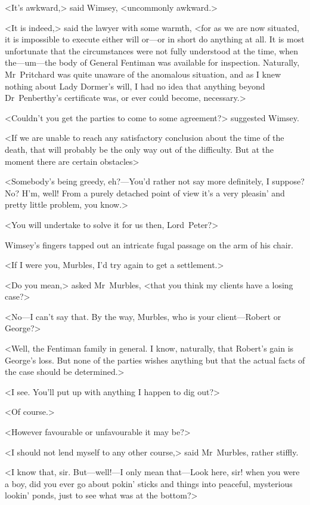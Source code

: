 <It's awkward,> said Wimsey, <uncommonly awkward.>

<It is indeed,> said the lawyer with some warmth, <for as we are now situated, it is impossible to execute either will or—or in short do anything at all. It is most unfortunate that the circumstances were not fully understood at the time, when the—um—the body of General Fentiman was available for inspection. Naturally, Mr~Pritchard was quite unaware of the anomalous situation, and as I knew nothing about Lady Dormer's will, I had no idea that anything beyond Dr~Penberthy's certificate was, or ever could become, necessary.>

<Couldn't you get the parties to come to some agreement?> suggested Wimsey.

<If we are unable to reach any satisfactory conclusion about the time of the death, that will probably be the only way out of the difficulty. But at the moment there are certain obstacles\longdash>

<Somebody's being greedy, eh?—You'd rather not say more definitely, I suppose? No? H'm, well! From a purely detached point of view it's a very pleasin' and pretty little problem, you know.>

<You will undertake to solve it for us then, Lord~Peter?>

Wimsey's fingers tapped out an intricate fugal passage on the arm of his chair.

<If I were you, Murbles, I'd try again to get a settlement.>

<Do you mean,> asked Mr~Murbles, <that you think my clients have a losing case?>

<No—I can't say that. By the way, Murbles, who is your client—Robert or George?>

<Well, the Fentiman family in general. I know, naturally, that Robert's gain is George's loss. But none of the parties wishes anything but that the actual facts of the case should be determined.>

<I see. You'll put up with anything I happen to dig out?>

<Of course.>

<However favourable or unfavourable it may be?>

<I should not lend myself to any other course,> said Mr~Murbles, rather stiffly.

<I know that, sir. But—well!—I only mean that—Look here, sir! when you were a boy, did you ever go about pokin' sticks and things into peaceful, mysterious lookin' ponds, just to see what was at the bottom?>

